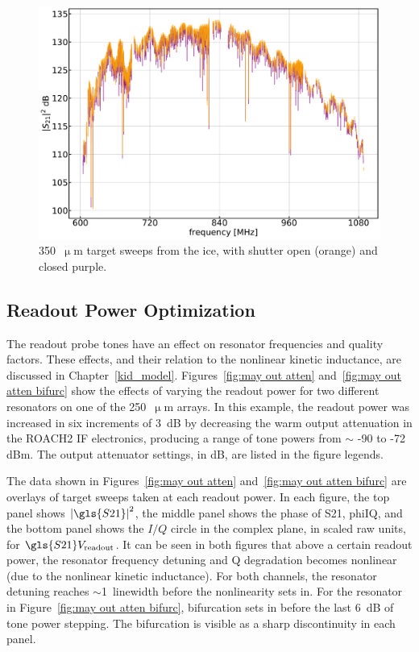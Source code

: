 \begin{figure}[!htbp]
\centering
\includegraphics[width=\textwidth]{figures/blast_data/sweeps/350_targ_ice_overplot}
\caption[~ target sweeps from the ice, with shutter open and closed.]{350~$\upmu$m target sweeps from the ice, with shutter open (orange) and closed {purple}.}
\label{fig:350 targ ice}
\end{figure}

\subsection{Readout Power Optimization}\label{readout power}

The readout probe tones have an effect on resonator frequencies and quality factors. These effects, and their relation to the nonlinear kinetic inductance, are discussed in Chapter~\ref{kid_model}. Figures~\ref{fig:may out atten} and~\ref{fig:may out atten bifurc} show the effects of varying the readout power for two different resonators on one of the 250~$\upmu$m arrays. In this example, the readout power was increased in six increments of 3~dB by decreasing the warm output attenuation in the ROACH2 IF electronics, producing a range of tone powers from $\sim$ -90 to -72 dBm. The output attenuator settings, in dB, are listed in the figure legends.

The data shown in Figures~\ref{fig:may out atten} and~\ref{fig:may out atten bifurc} are overlays of target sweeps taken at each readout power. In each figure, the top panel shows $\left| \gls{S21} \right|^{2}$, the middle panel shows the phase of \gls{S21}, \gls{phiIQ}, and the bottom panel shows the $I/Q$ circle in the complex plane, in scaled raw units, for $\gls{S21}V_{\mathrm{readout}}$. It can be seen in both figures that above a certain readout power, the resonator frequency detuning and Q degradation becomes nonlinear (due to the nonlinear kinetic inductance). For both channels, the resonator detuning reaches $\sim$1~linewidth before the nonlinearity sets in. For the resonator in Figure~\ref{fig:may out atten bifurc}, bifurcation sets in before the last 6~dB of tone power stepping. The bifurcation is visible as a sharp discontinuity in each panel.

